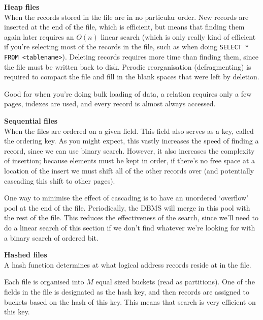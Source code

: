 \begin{description}
  \item \textbf{Heap files}\\
    When the records stored in the file are in no particular order. New records
    are inserted at the end of the file, which is efficient, but means that
    finding them again later requires an $O(n)$ linear search (which is only
    really kind of efficient if you're selecting most of the records in the
    file, such as when doing \texttt{SELECT * FROM <tablename>}). Deleting
    records requires more time than finding them, since the file must be written
    back to disk. Perodic reorganisation (defragmenting) is required to compact
    the file and fill in the blank spaces that were left by deletion.

    Good for when you're doing bulk loading of data, a relation requires only a
    few pages, indexes are used, and every record is almost always accessed.

  \item \textbf{Sequential files}\\

    When the files are ordered on a given field. This field also serves as a
    key, called the ordering key. As you might expect, this vastly increases the
    speed of finding a record, since we can use binary search. However, it also
    increases the complexity of insertion; because elements must be kept in
    order, if there's no free space at a location of the insert we must shift
    all of the other records over (and potentially cascading this shift to other
    pages).


    One way to minimise the effect of cascading is to have an unordered
    `overflow' pool at the end of the file. Periodically, the DBMS will merge in
    this pool with the rest of the file. This reduces the effectiveness of the
    search, since we'll need to do a linear search of this section if we don't
    find whatever we're looking for with a binary search of ordered bit.

  \item \textbf{Hashed files}\\

    A hash function determines at what logical address records reside at in the
    file.

    Each file is organised into $M$ equal sized buckets (read as partitions).
    One of the fields in the file is designated as the hash key, and then
    records are assigned to buckets based on the hash of this key. This means
    that search is very efficient on this key.


\end{description}
